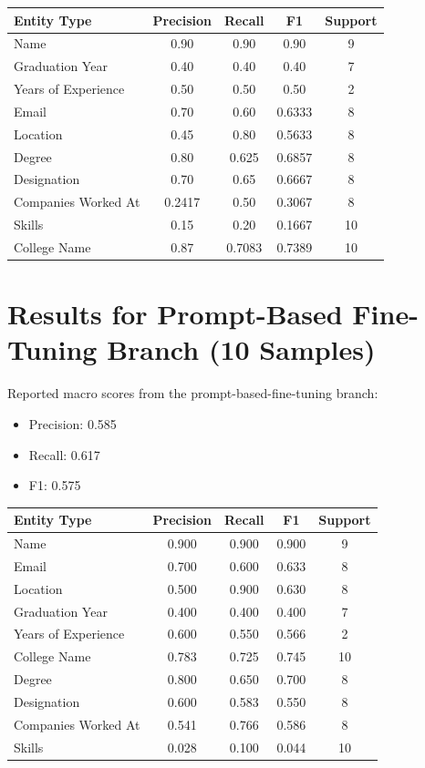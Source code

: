 \documentclass[11pt,a4paper]{article}
\begin{document}
\begin{longtable}{p{4cm}cccc}
\toprule
Entity Type & Precision & Recall & F1 & Support \\
\midrule
Name & 0.90 & 0.90 & 0.90 & 9 \\
Graduation Year & 0.40 & 0.40 & 0.40 & 7 \\
Years of Experience & 0.50 & 0.50 & 0.50 & 2 \\
Email & 0.70 & 0.60 & 0.6333 & 8 \\
Location & 0.45 & 0.80 & 0.5633 & 8 \\
Degree & 0.80 & 0.625 & 0.6857 & 8 \\
Designation & 0.70 & 0.65 & 0.6667 & 8 \\
Companies Worked At & 0.2417 & 0.50 & 0.3067 & 8 \\
Skills & 0.15 & 0.20 & 0.1667 & 10 \\
College Name & 0.87 & 0.7083 & 0.7389 & 10 \\
\bottomrule
\end{longtable}

\newpage

\section{Results for Prompt-Based Fine-Tuning Branch (10 Samples)}
Reported macro scores from the prompt-based-fine-tuning branch:
\begin{itemize}
\item Precision: 0.585
\item Recall: 0.617
\item F1: 0.575
\end{itemize}

\begin{longtable}{p{4cm}cccc}
\toprule
Entity Type & Precision & Recall & F1 & Support \\
\midrule
Name & 0.900 & 0.900 & 0.900 & 9 \\
Email & 0.700 & 0.600 & 0.633 & 8 \\
Location & 0.500 & 0.900 & 0.630 & 8 \\
Graduation Year & 0.400 & 0.400 & 0.400 & 7 \\
Years of Experience & 0.600 & 0.550 & 0.566 & 2 \\
College Name & 0.783 & 0.725 & 0.745 & 10 \\
Degree & 0.800 & 0.650 & 0.700 & 8 \\
Designation & 0.600 & 0.583 & 0.550 & 8 \\
Companies Worked At & 0.541 & 0.766 & 0.586 & 8 \\
Skills & 0.028 & 0.100 & 0.044 & 10 \\
\bottomrule
\end{longtable}
\end{document}
